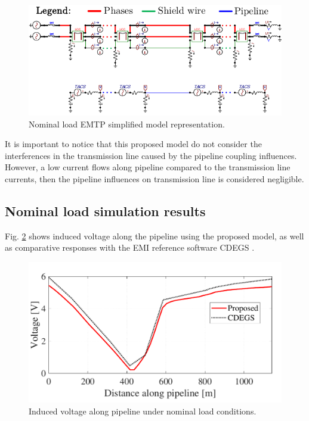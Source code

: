 \documentclass{IEEEtran4PSCC}
\begin{document}
\begin{figure}[hbt]
	\begin{center}
		\includegraphics[width=1\columnwidth]{./fig/NL_circuit.pdf}
		\caption{Nominal load EMTP simplified model representation.}
		\label{fig:NLcircuit}
	\end{center}
\end{figure}

It is important to notice that this proposed model do not consider the interferences in the transmission line caused by the pipeline coupling influences. However, a low current flows along pipeline compared to the transmission line currents, then the pipeline influences on transmission line is considered negligible. 

\subsection{Nominal load simulation results}

Fig. \ref{fig:NLvoltage} shows induced voltage along the pipeline using the proposed model, as well as comparative responses with the EMI reference software CDEGS \cite{Dawalibi1984a}. 

\begin{figure}[hbt]
	\begin{center}
		\includegraphics[width=1\columnwidth]{./fig/NL_voltage.pdf}
		\caption{Induced voltage along pipeline under nominal load conditions.}
		\label{fig:NLvoltage}
	\end{center}
\end{figure}
\end{document}
